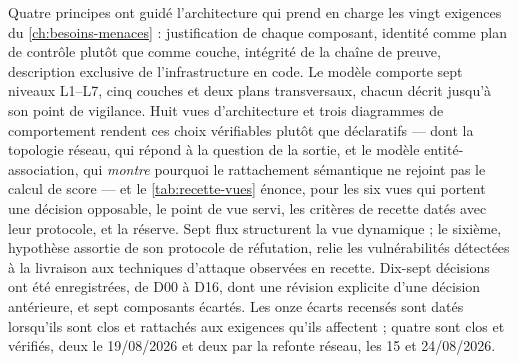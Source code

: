 Quatre principes ont guidé l'architecture qui prend en charge les vingt exigences du \cref{ch:besoins-menaces} :
justification de chaque composant, identité comme plan de contrôle plutôt que comme couche,
intégrité de la chaîne de preuve, description exclusive de l'infrastructure en code. Le modèle
comporte sept niveaux L1--L7, cinq couches et deux plans transversaux, chacun décrit jusqu'à son
point de vigilance. Huit vues d'architecture et trois diagrammes de comportement rendent ces choix
vérifiables plutôt que déclaratifs --- dont la topologie réseau, qui répond à la question de la
sortie, et le modèle entité-association, qui \emph{montre} pourquoi le rattachement sémantique ne
rejoint pas le calcul de score --- et le \cref{tab:recette-vues} énonce, pour les six vues qui
portent une décision opposable, le point de vue servi, les critères de recette datés avec leur
protocole, et la réserve. Sept flux
structurent la vue dynamique ; le sixième, hypothèse assortie de son protocole de réfutation,
relie les vulnérabilités détectées à la livraison aux techniques d'attaque observées en recette.
Dix-sept décisions ont été enregistrées, de D00 à D16, dont une révision explicite d'une décision
antérieure, et sept composants écartés. Les onze écarts recensés sont datés lorsqu'ils sont clos
et rattachés aux exigences qu'ils affectent ; quatre sont clos et vérifiés, deux le 19/08/2026 et
deux par la refonte réseau, les 15 et 24/08/2026.

\renewcommand{\topfraction}{0.7}
\renewcommand{\bottomfraction}{0.3}
\renewcommand{\textfraction}{0.2}
\renewcommand{\floatpagefraction}{0.5}
\setcounter{topnumber}{2}
\setcounter{totalnumber}{3}
\setlength{\textfloatsep}{20pt plus 2pt minus 4pt}
\setlength{\floatsep}{12pt plus 2pt minus 2pt}
\setlength{\intextsep}{12pt plus 2pt minus 2pt}
\setlength{\abovecaptionskip}{10pt}
\setlength{\belowcaptionskip}{0pt}
